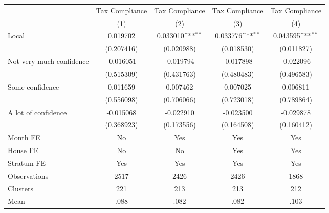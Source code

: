 {
\def\sym#1{\ifmmode^{#1}\else\(^{#1}\)\fi}
\begin{tabular}{l*{4}{c}}
\toprule
                &\multicolumn{1}{c}{Tax Compliance}&\multicolumn{1}{c}{Tax Compliance}&\multicolumn{1}{c}{Tax Compliance}&\multicolumn{1}{c}{Tax Compliance}\\
                &\multicolumn{1}{c}{(1)}         &\multicolumn{1}{c}{(2)}         &\multicolumn{1}{c}{(3)}         &\multicolumn{1}{c}{(4)}         \\
\midrule
Local           & 0.019702         & 0.033010\sym{**} & 0.033776\sym{**} & 0.043595\sym{**} \\
                &(0.207416)         &(0.020988)         &(0.018530)         &(0.011827)         \\
Not very much confidence&-0.016051         &-0.019794         &-0.017898         &-0.022096         \\
                &(0.515309)         &(0.431763)         &(0.480483)         &(0.496583)         \\
Some confidence & 0.011659         & 0.007462         & 0.007025         & 0.006811         \\
                &(0.556098)         &(0.706066)         &(0.723018)         &(0.789864)         \\
A lot of confidence&-0.015068         &-0.022910         &-0.023500         &-0.029878         \\
                &(0.368923)         &(0.173556)         &(0.164508)         &(0.160412)         \\
Month FE        &       No         &      Yes         &      Yes         &      Yes         \\
House FE        &       No         &       No         &      Yes         &      Yes         \\
Stratum FE      &      Yes         &      Yes         &      Yes         &      Yes         \\
\midrule
Observations    &     2517         &     2426         &     2426         &     1868         \\
Clusters        &      221         &      213         &      213         &      212         \\
Mean            &     .088         &     .082         &     .082         &     .103         \\
\bottomrule
\end{tabular}
}
